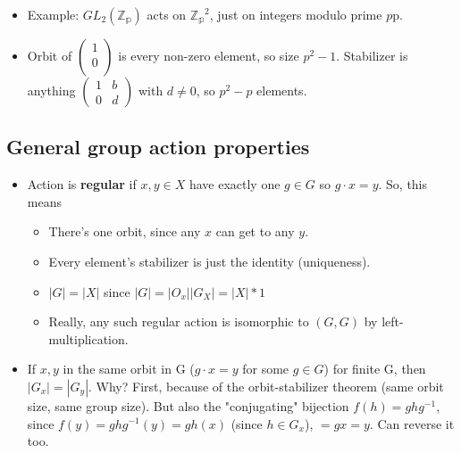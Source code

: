\documentclass[11pt, oneside]{article}   	%
\begin{document}
\begin{itemize}
\item Example: $GL_2(\mathbb{Z_p})$ acts on $\mathbb{Z_p}^2$, just on integers modulo prime $p$p.
\item Orbit of $\begin{pmatrix} 1 \\ 0 \\ \end{pmatrix} $ is every non-zero element, so size $p^2-1$.  Stabilizer is anything $\begin{pmatrix} 1 & b \\ 0 & d \end{pmatrix}$ with $d \neq 0$, so $p^2 - p$ elements.
\end{itemize}


\subsection{General group action properties}
\begin{itemize}
\item Action is \textbf{regular} if $x, y \in X$ have exactly one  $g \in G$ so $g \cdot x = y$.  So, this means
  \begin{itemize}
  \item There's one orbit, since any $x$ can get to any $y$.
  \item Every element's stabilizer is just the identity (uniqueness).
  \item $|G| = |X|$ since $|G| = |O_x| |G_X| = |X| * 1$
  \item Really, any such regular action is isomorphic to $(G , G)$ by left-multiplication.
  \end{itemize}
\item If $x, y$ in the same orbit in G ($g \cdot x = y$ for some $g \in G$) for finite G, then $|G_x| = |G_y|$. Why?  First, because of the orbit-stabilizer theorem (same orbit size, same group size).  But also the "conjugating" bijection $f(h) = ghg^{-1}$, since $f(y) = ghg^{-1}(y) = gh(x)$ (since $h \in G_x$), $ = gx = y$.  Can reverse it too.
\end{itemize}
\end{document}
